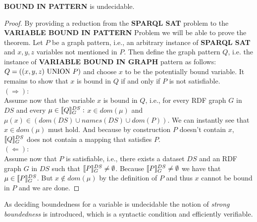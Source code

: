 \begin{theorem}
	\textbf{BOUND IN PATTERN} is undecidable.
\end{theorem}
\begin{proof}
By providing a reduction from the \textbf{SPARQL SAT} problem to the
\textbf{VARIABLE BOUND IN PATTERN} Problem we will be able to prove the theorem.
Let $P$ be a graph pattern, i.e., an arbitrary instance of \textbf{SPARQL SAT} and
$x,y,z$ variables not mentioned in $P$. Then define the graph pattern $Q$,
i.e. the instance of \textbf{VARIABLE BOUND IN GRAPH} pattern as follows: $Q =
((x,y,z) \mbox{ UNION }  P)$ and choose $x$ to be the potentially bound variable.
It remains to show that $x$ is bound in $Q$  if and only if $P$ is not
satisfiable.\\
$(\Rightarrow)$:\\
Assume now that the variable $x$ is bound in $Q$, i.e., for every RDF graph $G$
in $DS$ and every $\mu \in \llbracket Q \rrbracket^{DS}_G:$ $x \in dom(\mu)$ and $\mu(x) \in
(dom(DS) \cup names(DS) \cup dom(P))$. We can instantly see that $x \in
dom(\mu)$ must hold. And because by construction $P$ doesn't contain $x$, $\llbracket Q
\rrbracket^{DS}_G$ does not contain a mapping that satisfies $P$.\\
\noindent$(\Leftarrow)$:\\
Assume now that $P$ is satisfiable, i.e., there exists a dataset $DS$ and an RDF
graph $G$ in $DS$ such that $\llbracket P \rrbracket^{DS}_G \neq \emptyset$. Because 
$\llbracket P \rrbracket^{DS}_G \neq \emptyset$ we have that $\mu \in \llbracket P \rrbracket^{DS}_G$. But
$x \notin dom(\mu)$ by the definition of $P$ and thus $x$ cannot be bound in
$P$ and we are done.
\end{proof} 

As deciding boundedness for a variable is undecidable the notion of
\emph{strong boundedness} is introduced, which is a syntactic condition and
efficiently verifiable. 

